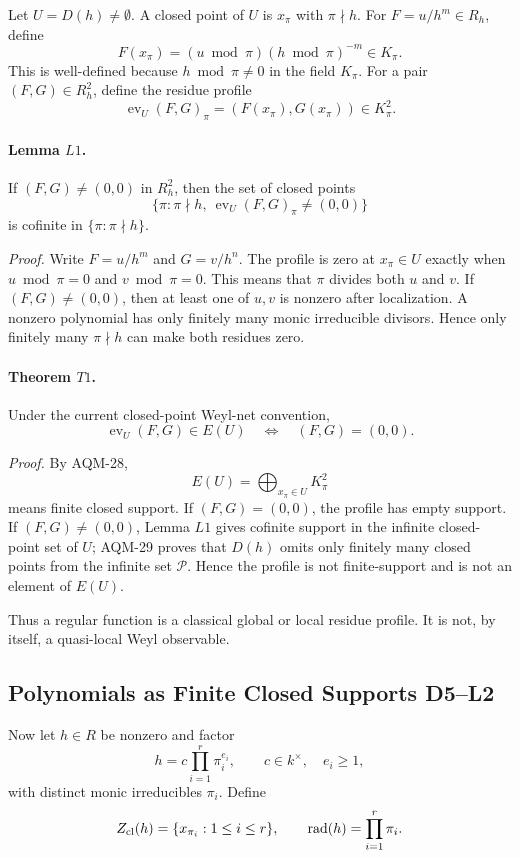 Let \(U=D(h)\ne\emptyset\).  A closed point of \(U\) is \(x_\pi\) with
\(\pi\nmid h\).  For \(F=u/h^m\in R_h\), define
\[
  F(x_\pi)=(u\bmod\pi)(h\bmod\pi)^{-m}\in K_\pi .
\]
This is well-defined because \(h\bmod\pi\ne0\) in the field \(K_\pi\).
For a pair \((F,G)\in R_h^2\), define the residue profile
\[
  \operatorname{ev}_U(F,G)_\pi=(F(x_\pi),G(x_\pi))\in K_\pi^2.
\]

\paragraph{Lemma \(L1\).}
If \((F,G)\ne(0,0)\) in \(R_h^2\), then the set of closed points
\[
  \{\pi:\pi\nmid h,\ \operatorname{ev}_U(F,G)_\pi\ne(0,0)\}
\]
is cofinite in \(\{\pi:\pi\nmid h\}\).

\emph{Proof.}
Write \(F=u/h^m\) and \(G=v/h^n\).  The profile is zero at \(x_\pi\in U\)
exactly when \(u\bmod\pi=0\) and \(v\bmod\pi=0\).  This means that \(\pi\)
divides both \(u\) and \(v\).  If \((F,G)\ne(0,0)\), then at least one of
\(u,v\) is nonzero after localization.  A nonzero polynomial has only finitely
many monic irreducible divisors.  Hence only finitely many \(\pi\nmid h\) can
make both residues zero.

\paragraph{Theorem \(T1\).}
Under the current closed-point Weyl-net convention,
\[
  \operatorname{ev}_U(F,G)\in E(U)
  \quad\Longleftrightarrow\quad
  (F,G)=(0,0).
\]

\emph{Proof.}
By AQM-28,
\[
  E(U)=\bigoplus_{x_\pi\in U}K_\pi^2
\]
means finite closed support.  If \((F,G)=(0,0)\), the profile has empty support.
If \((F,G)\ne(0,0)\), Lemma \(L1\) gives cofinite support in the infinite
closed-point set of \(U\); AQM-29 proves that \(D(h)\) omits only finitely many
closed points from the infinite set \(\mathcal P\).  Hence the profile is not
finite-support and is not an element of \(E(U)\).

Thus a regular function is a classical global or local residue profile.  It is
not, by itself, a quasi-local Weyl observable.

\subsection{Polynomials as Finite Closed Supports D5--L2}
Now let \(h\in R\) be nonzero and factor
\[
  h=c\prod_{i=1}^r\pi_i^{e_i},
  \qquad c\in k^\times,\quad e_i\ge1,
\]
with distinct monic irreducibles \(\pi_i\).  Define
\[
  Z_{\rm cl}(h)=\{x_{\pi_i}:1\le i\le r\},
  \qquad
  \operatorname{rad}(h)=\prod_{i=1}^r\pi_i .
\]

